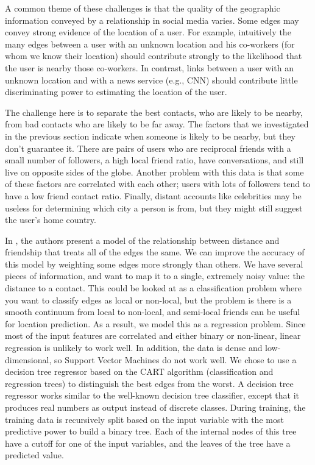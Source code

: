 
A common theme of these challenges is that the quality of the geographic
information conveyed by a relationship in social media varies.
%
Some edges may convey strong evidence of the location of a user.
%
For example, intuitively the many edges between a user with an unknown location
and his co-workers (for whom we know their location) should contribute strongly
to the likelihood that the user is nearby those co-workers.
%
In contrast, links between a user with an unknown location and with a news
service (e.g., CNN) should contribute little discriminating power to estimating
the location of the user.

The challenge here is to separate the best contacts, who are likely to be
nearby, from bad contacts who are likely to be far away.
%
The factors that we investigated in the previous section indicate when someone
is likely to be nearby, but they don't guarantee it.
%
There are pairs of users who are reciprocal friends with a small number of
followers, a high local friend ratio, have conversations, and still live on
opposite sides of the globe.
%
Another problem with this data is that some of these factors are correlated
with each other; users with lots of followers tend to have a low friend contact
ratio.
%
Finally, distant accounts like celebrities may be useless for determining which
city a person is from, but they might still suggest the user's home country.

In \cite{backstrom2010find}, the authors present a model of the relationship
between distance and friendship that treats all of the edges the same.
%
We can improve the accuracy of this model by weighting some edges more strongly
than others.
%
We have several pieces of information, and want to map it to a single, extremely
noisy value: the distance to a contact.
%
This could be looked at as a classification problem where you want to classify
edges as local or non-local, but the problem is there is a smooth continuum
from local to non-local, and semi-local friends can be useful for location
prediction.
%
As a result, we model this as a regression problem.
%
Since most of the input features are correlated and either binary or non-linear,
linear regression is unlikely to work well.
%
In addition, the data is dense and low-dimensional, so Support Vector Machines
do not work well.
%
We chose to use a decision tree regressor based on the CART algorithm
(classification and regression trees) to distinguish the best edges from the
worst.
%
A decision tree regressor works similar to the well-known decision tree
classifier, except that it produces real numbers as output instead of discrete
classes.
%
During training, the training data is recursively split based on the input
variable with the most predictive power to build a binary tree.
%
Each of the internal nodes of this tree have a cutoff for one of the input
variables, and the leaves of the tree have a predicted value.

